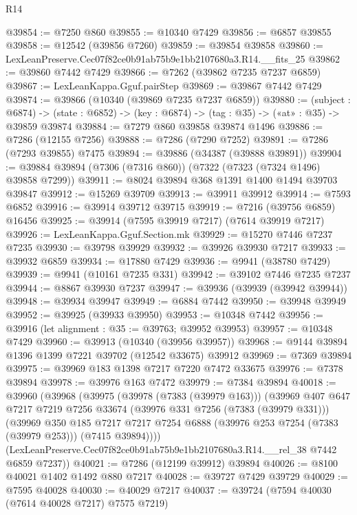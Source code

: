 \begin{lexlean}{R14}
\begin{coremodule}
@39854 := @7250 @860
@39855 := @10340 @7429
@39856 := @6857 @39855
@39858 := @12542 (@39856 @7260)
@39859 := @39854 @39858
@39860 := LexLeanPreserve.Cec07f82ce0b91ab75b9e1bb2107680a3.R14.__fits_25
@39862 := @39860 @7442 @7429
@39866 := @7262 (@39862 @7235 @7237 @6859)
@39867 := LexLeanKappa.Gguf.pairStep
@39869 := @39867 @7442 @7429
@39874 := @39866 (@10340 (@39869 @7235 @7237 @6859))
@39880 := (subject : @6874) ->
  (state : @6852) -> (key : @6874) -> (tag : @35) -> («at» : @35) -> @39859 @39874
@39884 := @7279 @860 @39858 @39874 @1496
@39886 := @7286 (@12155 @7256)
@39888 := @7286 (@7290 @7252)
@39891 := @7286 (@7293 @39855) @7475
@39894 := @39886 (@34387 (@39888 @39891))
@39904 := @39884 @39894 (@7306 (@7316 @860)) (@7322 (@7323 (@7324 @1496) @39858 @7299))
@39911 := @8024 @39894 @368 @1391 @1400 @1494 @39703 @39847
@39912 := @15269 @39709
@39913 := @39911 @39912
@39914 := @7593 @6852
@39916 := @39914 @39712 @39715
@39919 := @7216 (@39756 @6859) @16456
@39925 := @39914 (@7595 @39919 @7217) (@7614 @39919 @7217)
@39926 := LexLeanKappa.Gguf.Section.mk
@39929 := @15270 @7446 @7237 @7235
@39930 := @39798 @39929
@39932 := @39926 @39930 @7217
@39933 := @39932 @6859
@39934 := @17880 @7429
@39936 := @9941 (@38780 @7429)
@39939 := @9941 (@10161 @7235 @331)
@39942 := @39102 @7446 @7235 @7237
@39944 := @8867 @39930 @7237
@39947 := @39936 (@39939 (@39942 @39944))
@39948 := @39934 @39947
@39949 := @6884 @7442
@39950 := @39948 @39949
@39952 := @39925 (@39933 @39950)
@39953 := @10348 @7442
@39956 := @39916 (let alignment : @35 := @39763; @39952 @39953)
@39957 := @10348 @7429
@39960 := @39913 (@10340 (@39956 @39957))
@39968 := @9144 @39894 @1396 @1399 @7221 @39702 (@12542 @33675) @39912
@39969 := @7369 @39894
@39975 := @39969 @183 @1398 @7217 @7220 @7472 @33675
@39976 := @7378 @39894
@39978 := @39976 @163 @7472
@39979 := @7384 @39894
@40018 := @39960
    (@39968
      (@39975
        (@39978 (@7383 (@39979 @163)))
        (@39969
          @407
          @647
          @7217
          @7219
          @7256
          @33674
          (@39976 @331 @7256 (@7383 (@39979 @331)))
          (@39969
            @350
            @185
            @7217
            @7217
            @7254
            @6888
            (@39976 @253 @7254 (@7383 (@39979 @253)))
            (@7415 @39894))))
      (LexLeanPreserve.Cec07f82ce0b91ab75b9e1bb2107680a3.R14.__rel_38 @7442 @6859 @7237))
@40021 := @7286 (@12199 @39912) @39894
@40026 := @8100 @40021 @1402 @1492 @880 @7217
@40028 := @39727 @7429 @39729
@40029 := @7595 @40028
@40030 := @40029 @7217
@40037 := @39724 (@7594 @40030 (@7614 @40028 @7217) @7575 @7219)

\end{coremodule}
\end{lexlean}
